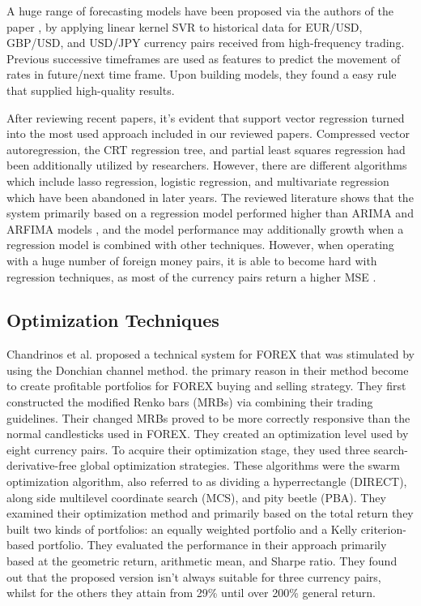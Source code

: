 A huge range of forecasting models have been proposed via the authors of the paper \cite{Serjam18}, by  applying linear kernel SVR to historical data for EUR/USD, GBP/USD, and USD/JPY currency pairs received from high-frequency trading. Previous successive timeframes are used as features to predict the movement of rates in future/next time frame. Upon building models, they found a easy rule that supplied high-quality results.

After reviewing recent papers, it's evident that support vector regression turned into the most used approach included in our reviewed papers. Compressed vector autoregression, the CRT regression tree, and partial least squares regression had been additionally utilized by researchers. However, there are different algorithms which include lasso regression, logistic regression, and multivariate regression which have been abandoned in later years. 
The reviewed literature shows that the system primarily based on a regression model performed higher than ARIMA and ARFIMA models \cite{Raimundo18}, and the model performance may additionally growth \cite{Achchab17} when a regression model is combined with other techniques. However, when operating with a huge number of foreign money pairs, it is able to become hard with regression techniques, as most of the currency pairs return a higher MSE \citep{Taveeapiradeecharoen19}.

\subsection{Optimization Techniques}
Chandrinos et al. \cite{Chandrinos18} proposed a technical system for FOREX that was stimulated by using the Donchian channel method. the primary reason in their method become to create profitable portfolios for FOREX buying and selling strategy. They first constructed the modified Renko bars (MRBs) via combining their trading guidelines. Their changed MRBs proved to be more correctly responsive than the normal candlesticks used in FOREX. They created an optimization level used by eight currency pairs.  To acquire their optimization stage, they used three search-derivative-free global optimization strategies. These algorithms were the swarm optimization algorithm, also referred to as dividing a hyperrectangle (DIRECT), along side multilevel coordinate search (MCS), and pity beetle (PBA). They examined their optimization method and primarily based on the total return they built two kinds of portfolios: an equally weighted portfolio and a Kelly criterion-based portfolio. They evaluated the performance in their approach primarily based at the geometric return, arithmetic mean, and Sharpe ratio. They found out that the proposed version isn't always suitable for three currency pairs, whilst for the others they attain from 29\% until over 200\% general return.


